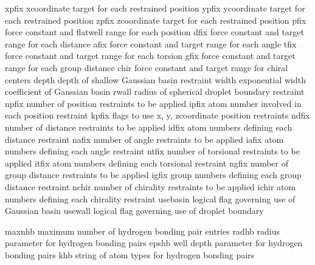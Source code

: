 \documentclass[letterpaper,11pt,english]{sphinxmanual}
\begin{document}
\begin{sphinxVerbatim}[commandchars=\\\{\}]
xpfix           x\PYGZhy{}coordinate target for each restrained position
ypfix           y\PYGZhy{}coordinate target for each restrained position
zpfix           z\PYGZhy{}coordinate target for each restrained position
pfix            force constant and flat\PYGZhy{}well range for each position
dfix            force constant and target range for each distance
afix            force constant and target range for each angle
tfix            force constant and target range for each torsion
gfix            force constant and target range for each group distance
chir            force constant and target range for chiral centers
depth           depth of shallow Gaussian basin restraint
width           exponential width coefficient of Gaussian basin
rwall           radius of spherical droplet boundary restraint
npfix           number of position restraints to be applied
ipfix           atom number involved in each position restraint
kpfix           flags to use x\PYGZhy{}, y\PYGZhy{}, z\PYGZhy{}coordinate position restraints
ndfix           number of distance restraints to be applied
idfix           atom numbers defining each distance restraint
nafix           number of angle restraints to be applied
iafix           atom numbers defining each angle restraint
ntfix           number of torsional restraints to be applied
itfix           atom numbers defining each torsional restraint
ngfix           number of group distance restraints to be applied
igfix           group numbers defining each group distance restraint
nchir           number of chirality restraints to be applied
ichir           atom numbers defining each chirality restraint
use\PYGZus{}basin       logical flag governing use of Gaussian basin
use\PYGZus{}wall        logical flag governing use of droplet boundary
\end{sphinxVerbatim}


\begin{sphinxVerbatim}[commandchars=\\\{\}]
maxnhb          maximum number of hydrogen bonding pair entries
radhb           radius parameter for hydrogen bonding pairs
epshb           well depth parameter for hydrogen bonding pairs
khb             string of atom types for hydrogen bonding pairs
\end{sphinxVerbatim}
\end{document}

